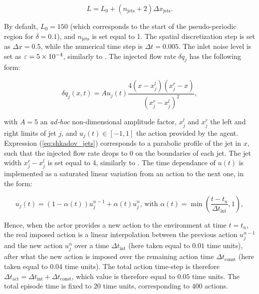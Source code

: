\begin{equation}
	L = L_0 + \left( n_\text{jets} + 2\right) \Delta x_\text{jets}.
\end{equation}

By default, $L_0 = 150$ (which corresponds to the start of the pseudo-periodic region for $\delta = 0.1$), and $n_\text{jets}$ is set equal to 1. The spatial discretization step is set as $\Delta x = 0.5$, while the numerical time step is $\Delta t = 0.005$. The inlet noise level is set as $\varepsilon = \num{5e-4}$, similarly to \cite{belus2019}. The injected flow rate $\delta q_j$ has the following form:

\begin{equation}
\label{eq:shkadov_jets}
	\delta q_j (x,t) = A u_j(t) \frac{4 \left( x - x_j^l \right) \left( x_j^r - x \right)}{ \left( x_j^r - x_j^l \right)^2},
\end{equation}

with $A=5$ an \textit{ad-hoc} non-dimensional amplitude factor, $x_j^l$ and $x_j^r$ the left and right limits of jet $j$, and $u_j(t) \in [-1,1]$ the action provided by the agent. Expression (\ref{eq:shkadov_jets}) corresponds to a parabolic profile of the jet in $x$, such that the injected flow rate drops to $0$ on the boundaries of each jet. The jet width $x_j^r - x_j^l$ is set equal to $4$, similarly to \cite{belus2019}. The time dependance of $u(t)$ is implemented as a saturated linear variation from an action to the next one, in the form:

\begin{equation}
\label{eq:shkadov_actions}
	u_j(t) = (1-\alpha(t)) u_j^{n-1} + \alpha(t) u_j^n \text{, with } \alpha(t) = \min \left( \frac{t-t_n}{\Delta t_\text{int}}, 1 \right),
\end{equation}

Hence, when the actor provides a new action to the environment at time $t=t_n$, the real imposed action is a linear interpolation between the previous action $u_j^{n-1}$ and the new action $u_j^n$ over a time $\Delta t_\text{int}$ (here taken equal to $0.01$ time units), after what the new action is imposed over the remaining action time $\Delta t_\text{const}$ (here taken equal to $0.04$ time units). The total action time-step is therefore $\Delta t_\text{act} = \Delta t_\text{int} + \Delta t_\text{const}$, which value is therefore equal to $0.05$ time units. The total episode time is fixed to $20$ time units, corresponding to $400$ actions.



